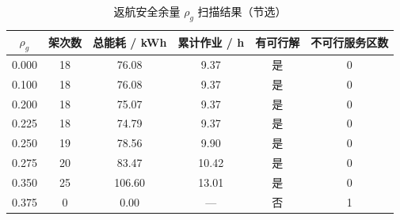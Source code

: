 \begin{table}[htbp]
\caption{返航安全余量 $\rho_{g}$ 扫描结果（节选）}
\label{tab:q1_rho_sweep}
\centering
{}
\setlength{\tabcolsep}{4pt}
\begin{tabular}{cccccc}
\toprule
$\rho_{g}$ & 架次数 & 总能耗 / kWh & 累计作业 / h & 有可行解 & 不可行服务区数 \\
\midrule
0.000 & 18 & 76.08 & 9.37 & 是 & 0 \\
0.100 & 18 & 76.08 & 9.37 & 是 & 0 \\
0.200 & 18 & 75.07 & 9.37 & 是 & 0 \\
0.225 & 18 & 74.79 & 9.37 & 是 & 0 \\
0.250 & 19 & 78.56 & 9.90 & 是 & 0 \\
0.275 & 20 & 83.47 & 10.42 & 是 & 0 \\
0.350 & 25 & 106.60 & 13.01 & 是 & 0 \\
0.375 & 0 & 0.00 & — & 否 & 1 \\
\bottomrule
\end{tabular}
\end{table}
